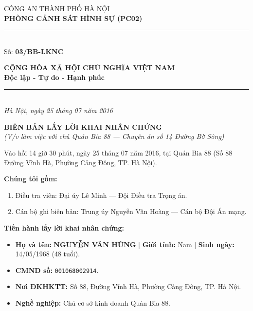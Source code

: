 \documentclass[12pt,a4paper]{article}
\begin{document}
\noindent
\begin{minipage}[t]{0.46\textwidth}
    \begin{center}
        \fontsize{11pt}{13pt}\selectfont
        CÔNG AN THÀNH PHỐ HÀ NỘI\\
        \textbf{PHÒNG CẢNH SÁT HÌNH SỰ (PC02)}\\[-0.2em]
        \rule{3.2cm}{0.6pt}\\[0.25cm]
        \fontsize{11pt}{13pt}\selectfont Số: \textbf{03/BB-LKNC}
    \end{center}
\end{minipage}
\hfill
\begin{minipage}[t]{0.52\textwidth}
    \begin{center}
        \fontsize{11pt}{13pt}\selectfont
        \textbf{CỘNG HÒA XÃ HỘI CHỦ NGHĨA VIỆT NAM}\\
        \textbf{Độc lập - Tự do - Hạnh phúc}\\[-0.2em]
        \rule{3.6cm}{0.6pt}\\[0.25cm]
        \textit{Hà Nội, ngày 25 tháng 07 năm 2016}
    \end{center}
\end{minipage}

\vspace{0.5cm}

\begin{center}
    \textbf{\Large BIÊN BẢN LẤY LỜI KHAI NHÂN CHỨNG}\\[0.15cm]
    \textit{(V/v làm việc với chủ Quán Bia 88 — Chuyên án số 14 Đường Bờ Sông)}
\end{center}

\vspace{0.3cm}


Vào hồi 14 giờ 30 phút, ngày 25 tháng 07 năm 2016, tại Quán Bia 88 (Số 88 Đường Vĩnh Hà, Phường Cảng Đông, TP. Hà Nội).

\textbf{Chúng tôi gồm:}

\begin{enumerate}[label=\arabic*., leftmargin=*, itemsep=2pt, topsep=2pt, parsep=0pt]
  \item Điều tra viên: Đại úy Lê Minh — Đội Điều tra Trọng án.
  \item Cán bộ ghi biên bản: Trung úy Nguyễn Văn Hoàng — Cán bộ Đội Án mạng.

\end{enumerate}
\textbf{Tiến hành lấy lời khai nhân chứng:}

\begin{itemize}[leftmargin=*, itemsep=2pt, topsep=2pt, parsep=0pt]
  \item \textbf{Họ và tên:} \textbf{NGUYỄN VĂN HÙNG} | \textbf{Giới tính:} Nam | \textbf{Sinh ngày:} 14/05/1968 (48 tuổi).
  \item \textbf{CMND số:} \texttt{001068002914}.
  \item \textbf{Nơi ĐKHKTT:} Số 88, Đường Vĩnh Hà, Phường Cảng Đông, TP. Hà Nội.
  \item \textbf{Nghề nghiệp:} Chủ cơ sở kinh doanh Quán Bia 88.


\end{itemize}
\end{document}
